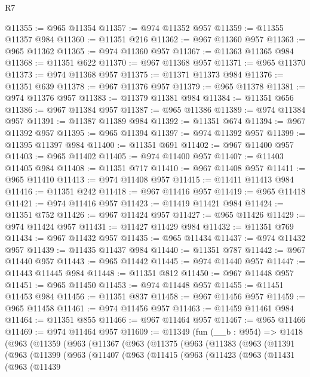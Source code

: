 \begin{lexlean}{R7}
\begin{coremodule}
@11355 := @965 @11354
@11357 := @974 @11352 @957
@11359 := @11355 @11357 @984
@11360 := @11351 @216
@11362 := @967 @11360 @957
@11363 := @965 @11362
@11365 := @974 @11360 @957
@11367 := @11363 @11365 @984
@11368 := @11351 @622
@11370 := @967 @11368 @957
@11371 := @965 @11370
@11373 := @974 @11368 @957
@11375 := @11371 @11373 @984
@11376 := @11351 @639
@11378 := @967 @11376 @957
@11379 := @965 @11378
@11381 := @974 @11376 @957
@11383 := @11379 @11381 @984
@11384 := @11351 @656
@11386 := @967 @11384 @957
@11387 := @965 @11386
@11389 := @974 @11384 @957
@11391 := @11387 @11389 @984
@11392 := @11351 @674
@11394 := @967 @11392 @957
@11395 := @965 @11394
@11397 := @974 @11392 @957
@11399 := @11395 @11397 @984
@11400 := @11351 @691
@11402 := @967 @11400 @957
@11403 := @965 @11402
@11405 := @974 @11400 @957
@11407 := @11403 @11405 @984
@11408 := @11351 @717
@11410 := @967 @11408 @957
@11411 := @965 @11410
@11413 := @974 @11408 @957
@11415 := @11411 @11413 @984
@11416 := @11351 @242
@11418 := @967 @11416 @957
@11419 := @965 @11418
@11421 := @974 @11416 @957
@11423 := @11419 @11421 @984
@11424 := @11351 @752
@11426 := @967 @11424 @957
@11427 := @965 @11426
@11429 := @974 @11424 @957
@11431 := @11427 @11429 @984
@11432 := @11351 @769
@11434 := @967 @11432 @957
@11435 := @965 @11434
@11437 := @974 @11432 @957
@11439 := @11435 @11437 @984
@11440 := @11351 @787
@11442 := @967 @11440 @957
@11443 := @965 @11442
@11445 := @974 @11440 @957
@11447 := @11443 @11445 @984
@11448 := @11351 @812
@11450 := @967 @11448 @957
@11451 := @965 @11450
@11453 := @974 @11448 @957
@11455 := @11451 @11453 @984
@11456 := @11351 @837
@11458 := @967 @11456 @957
@11459 := @965 @11458
@11461 := @974 @11456 @957
@11463 := @11459 @11461 @984
@11464 := @11351 @855
@11466 := @967 @11464 @957
@11467 := @965 @11466
@11469 := @974 @11464 @957
@11609 := @11349
    (fun (__b : @954) =>
    @1418
      (@963
        (@11359
          (@963
            (@11367
              (@963
                (@11375
                  (@963
                    (@11383
                      (@963
                        (@11391
                          (@963
                            (@11399
                              (@963
                                (@11407
                                  (@963
                                    (@11415
                                      (@963
                                        (@11423
                                          (@963
                                            (@11431
                                              (@963
                                                (@11439

\end{coremodule}
\end{lexlean}
